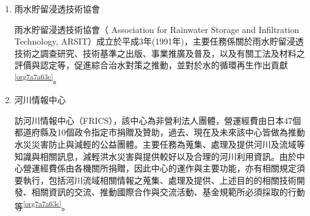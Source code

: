 \documentclass[a4paper,12pt]{article}
\begin{document}
\begin{enumerate}
\begin{enumerate}
東京都隨都市化進展，降雨逕流大增，水害頻繁威脅住民生命財產安全，遂推展「中小河川流域治水計畫」，重新建立下水道的排水標準，將設計標準從 3 年頻率降雨強度 50.0mm/hr，提昇至 15 年頻率降雨強度75.0mm/hr 以上。除了提高老舊的下水道（排水路）、抽水站的排水標準外，也加入蓄洪、入滲、貯留、系統預測、土地管制檢討等減洪思維，新建地下調節池及雨水貯留管。地下調節池可疏導調節 25％之洪水量。\\

在建立地下調節池及雨水貯留管的初期，日本政府曾被質疑為何不直接浚深河川，透過增加通水斷面減少水患。浚深河川的難處在於，日本都市化發展飽和，許多河川水道之下已佈滿地鐵、自來水、瓦斯等設施管線，因此改以建立地下調節池及雨水貯留管來提昇排水標準。未來台北市也可能面臨類似問題，加上潮汐迴水的問題，可將地下調節池及雨水貯留管列為長期的規劃目標。惟興建此類設施的人力、時間、經費成本都極為巨大，政府應讓公民更加深入了解此議題，促進未來的政策透明及規劃方向\footnote{\href{https://pansci.asia/archives/75374}{若大禹再世（一）：治水策略 學日荷，好不好？}\\}。\\

\item 雨水貯留浸透技術協會
\label{sec:orgddac527}

雨水貯留浸透技術協會（ Association for Rainwater Storage and Infiltration Technology, ARSIT）成立於平成3年(1991年)，主要任務係關於雨水貯留浸透技術之調查研究、技術基準之出版、事業推廣及普及，以及有關工法及材料之評價與認定等，促進綜合治水對策之推動，並對於水的循環再生作出貢獻\textsuperscript{\ref{org7a7a63c}}。\\

\item 河川情報中心
\label{sec:orge904058}

訪河川情報中心（FRICS），該中心為非營利法人團體，營運經費由日本47個都道府縣及10個政令指定市捐贈及贊助，過去、現在及未來該中心皆做為推動水災災害防止與減輕的公益團體。主要任務為蒐集、處理及提供河川及流域等知識與相關訊息，減輕洪水災害與提供較好以及合理的河川利用資訊。由於中心營運經費係由各機關所捐贈，因此中心的運作與主要功能，亦有相關規定須要執行，包括河川流域相關情報之蒐集、處理及提供、上述目的的相關技術開發、相關資訊的交流、推動國際合作與交流活動、基金規範所必須採取的行動等\textsuperscript{\ref{org7a7a63c}}。\\


\end{enumerate}
\end{enumerate}
\end{document}
